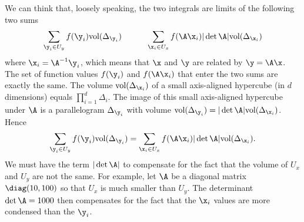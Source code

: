\begin{exenumerate}
  \begin{solution} We can think that, loosely speaking, the two integrals
    are limits of the following two sums
    \begin{equation} \sum_{\y_i \in U_y}
      f(\y_i) \textrm{vol}(\Delta_{\y_i}) \quad \quad \quad \sum_{\x_i \in U_x}
      f(\A \x_i) |\det \A| \textrm{vol}(\Delta_{\x_i})
    \end{equation}
    where $\x_i = \A^{-1} \y_i$, which means that $\x$ and $\y$ are related
    by $\y = \A \x$. The set of function values $f(\y_i)$ and $f(\A \x_i)$
    that enter the two sums are exactly the same. The volume
    $\textrm{vol}(\Delta_{\x_i})$ of a small axis-aligned hypercube (in $d$
    dimensions) equals $\prod_{i=1}^d \Delta_i$. The image of this small
    axis-aligned hypercube under $\A$ is a parallelogram $\Delta_{\y_i}$
    with volume $\textrm{vol}(\Delta_{\y_i})= |\det \A|
    \textrm{vol}(\Delta_{\x_i})$. Hence
    \begin{equation}
      \sum_{\y_i \in U_y} f(\y_i) \textrm{vol}(\Delta_{\y_i}) = \sum_{\x_i \in U_x} f(\A \x_i) |\det \A| \textrm{vol}(\Delta_{\x_i}).
    \end{equation}
    We must have the term $|\det \A|$ to compensate for the fact that the volume of $U_x$ and $U_y$ are not the same. For example, let $\A$ be a diagonal matrix $\diag(10, 100)$ so that $U_x$ is much smaller than $U_y$. The determinant $\det \A = 1000$ then compensates for the fact that the $\x_i$ values are more condensed than the $\y_i$.
  \end{solution}
  
\end{exenumerate}
     


